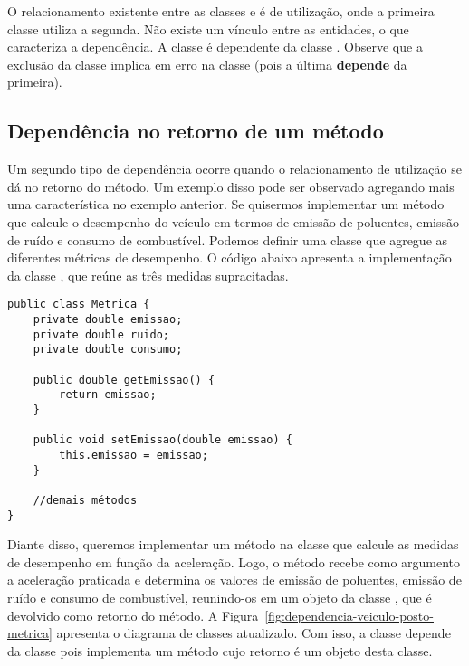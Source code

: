 O relacionamento existente entre as classes  e  é de utilização, onde a primeira classe utiliza a segunda. Não existe um vínculo entre as entidades, o que caracteriza a dependência. A classe  é dependente da classe . Observe que a exclusão da classe  implica em erro na classe  (pois a última \textbf{depende} da primeira).

\subsection{Dependência no retorno de um método}

Um segundo tipo de dependência ocorre quando o relacionamento de utilização se dá no retorno do método. Um exemplo disso pode ser observado agregando mais uma característica no exemplo anterior. Se quisermos implementar um método que calcule o desempenho do veículo em termos de emissão de poluentes, emissão de ruído e consumo de combustível. Podemos definir uma classe que agregue as diferentes métricas de desempenho. O código abaixo apresenta a implementação da classe , que reúne as três medidas supracitadas.

\begin{verbatim}
public class Metrica {
	private double emissao;
	private double ruido;
	private double consumo;
	
	public double getEmissao() {
		return emissao;
	}
	
	public void setEmissao(double emissao) {
		this.emissao = emissao;
	}
	
	//demais métodos
}
\end{verbatim}

Diante disso, queremos implementar um método na classe  que calcule as medidas de desempenho em função da aceleração. Logo, o método  recebe como argumento a aceleração praticada e determina os valores de emissão de poluentes, emissão de ruído e consumo de combustível, reunindo-os em um objeto da classe , que é devolvido como retorno do método. A Figura~\ref{fig:dependencia-veiculo-posto-metrica} apresenta o diagrama de classes atualizado. Com isso, a classe  depende da classe  pois implementa um método cujo retorno é um objeto desta classe.

